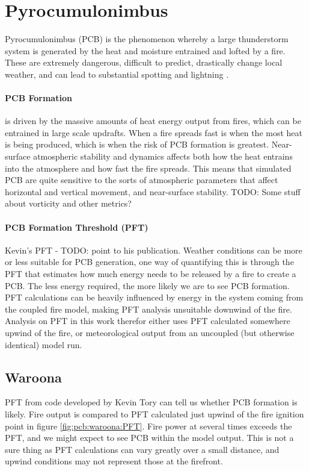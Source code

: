 \section{Pyrocumulonimbus}
  \label{pcb}
  
  Pyrocumulonimbus (PCB) is the phenomenon whereby a large thunderstorm system is generated by the heat and moisture entrained and lofted by a fire.
  These are extremely dangerous, difficult to predict, drastically change local weather, and can lead to substantial spotting and lightning \cite{Peace2017}.
  
  \paragraph{PCB Formation} is driven by the massive amounts of heat energy output from fires, which can be entrained in large scale updrafts.
  When a fire spreads fast is when the most heat is being produced, which is when the risk of PCB formation is greatest.
  Near-surface atmospheric stability and dynamics affects both how the heat entrains into the atmosphere and how fast the fire spreads.
  This means that simulated PCB are quite sensitive to the sorts of atmospheric parameters that affect horizontal and vertical movement, and near-surface stability.
  TODO: Some stuff about vorticity and other metrics?
  
  \paragraph{PCB Formation Threshold (PFT)}
  Kevin's PFT - TODO: point to his publication.
  Weather conditions can be more or less suitable for PCB generation, one way of quantifying this is through the PFT that estimates how much energy needs to be released by a fire to create a PCB.
  The less energy required, the more likely we are to see PCB formation.
  PFT calculations can be heavily influenced by energy in the system coming from the coupled fire model, making PFT analysis unsuitable downwind of the fire.
  Analysis on PFT in this work therefor either uses PFT calculated somewhere upwind of the fire, or meteorological output from an uncoupled (but otherwise identical) model run.
  
  \subsection{Waroona}
    \label{pcb:waroona}
    
    PFT from code developed by Kevin Tory can tell us whether PCB formation is likely.
    Fire output is compared to PFT calculated just upwind of the fire ignition point in figure \ref{fig:pcb:waroona:PFT}.
    Fire power at several times exceeds the PFT, and we might expect to see PCB within the model output.
    This is not a sure thing as PFT calculations can vary greatly over a small distance, and upwind conditions may not represent those at the firefront.
    
